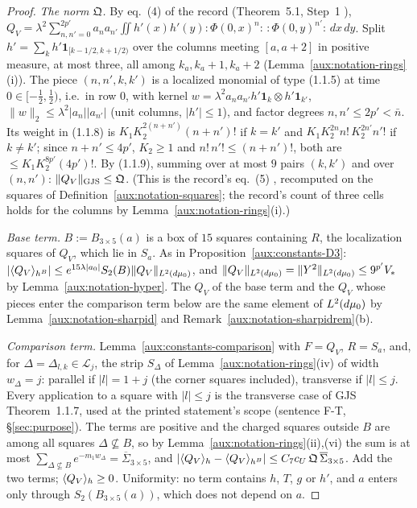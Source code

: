 \begin{proof}
\emph{The norm $\mathfrak Q$.}  By eq.~(4) of the record (Theorem~5.1, Step~1
\cite[p.~18]{R}), $Q_V=\lambda^2\sum_{n,n'=0}^{2p'}a_na_{n'}\iint h'(x)h'(y)
{:}\Phi(0,x)^n{:}\,{:}\Phi(0,y)^{n'}{:}\,dx\,dy$.  Split $h'=\sum_kh'\mathbf
1_{[k-1/2,k+1/2)}$ over the columns meeting $[a,a+2]$ in positive measure, at most three, all
among $k_a,k_a+1,k_a+2$ (Lemma~\ref{aux:notation-rings}(i)).  The piece $(n,n',k,k')$ is a
localized monomial of type (1.1.5) at time $0\in[-\frac12,\frac12)$, i.e.\ in row $0$, with
kernel $w=\lambda^2a_na_{n'}h'\mathbf 1_{k}\otimes h'\mathbf 1_{k'}$,
$\|w\|_2\le\lambda^2|a_n||a_{n'}|$ (unit columns, $|h'|\le1$), and factor degrees
$n,n'\le2p'<\bar n$.  Its weight in (1.1.8) is $K_1K_2^{2(n+n')}(n+n')!$ if $k=k'$ and
$K_1K_2^{2n}n!\,K_2^{2n'}n'!$ if $k\ne k'$; since $n+n'\le4p'$, $K_2\ge1$ and
$n!\,n'!\le(n+n')!$, both are $\le K_1K_2^{8p'}(4p')!$.  By (1.1.9), summing over at most $9$
pairs $(k,k')$ and over $(n,n')$: $\lVert Q_V\rVert_{\mathrm{GJS}}\le\mathfrak Q$.  (This is the record's eq.~(5)
\cite[p.~19]{R}, recomputed on the squares of Definition~\ref{aux:notation-squares}; the
record's count of three cells holds for the columns by Lemma~\ref{aux:notation-rings}(i).)

\emph{Base term.}  $B:=B_{3\times5}(a)$ is a box of $15$ squares containing $R$, the
localization squares of $Q_V$, which lie in $S_a$.  As in Proposition~\ref{aux:constants-D3}:
$|\langle Q_V\rangle_{h^B}|\le e^{15\lambda|a_0|}S_2(B)\|Q_V\|_{L^2(d\mu_0)}$, and
$\|Q_V\|_{L^2(d\mu_0)}=\|Y^2\|_{L^2(d\mu_0)}\le9^{p'}V_*$ by Lemma~\ref{aux:notation-hyper}.  The
$Q_V$ of the base term and the $Q_V$ whose pieces enter the comparison term below are the same
element of $L^2(d\mu_0)$ by Lemma~\ref{aux:notation-sharpid} and
Remark~\ref{aux:notation-sharpidrem}(b).

\emph{Comparison term.}  Lemma~\ref{aux:constants-comparison} with $F=Q_V$, $R=S_a$, and, for
$\Delta=\Delta_{l,k}\in\mathcal L_j$, the strip $S_\Delta$ of Lemma~\ref{aux:notation-rings}(iv) of
width $w_\Delta=j$: parallel if $|l|=1+j$ (the corner squares included), transverse if
$|l|\le j$.  Every application to a square with $|l|\le j$ is the transverse case of GJS
Theorem~1.1.7, used at the printed statement's scope (sentence F-T, \S\ref{sec:purpose}).  The
terms are positive and the charged squares outside $B$ are among all squares $\Delta\not\subseteq
B$, so by Lemma~\ref{aux:notation-rings}(ii),(vi) the sum is at most
$\sum_{\Delta\not\subseteq B}e^{-m_1w_\Delta}=\overline\Sigma_{3\times5}$, and
$|\langle Q_V\rangle_{h}-\langle Q_V\rangle_{h^B}|\le C_7c_U\,\mathfrak Q\,\overline\Sigma_{3\times5}$.  Add the two
terms; $\langle Q_V\rangle_{h}\ge0$.  Uniformity: no
term contains $h$, $T$, $g$ or $h'$, and $a$ enters only through $S_2(B_{3\times5}(a))$, which
does not depend on $a$.
\end{proof}

